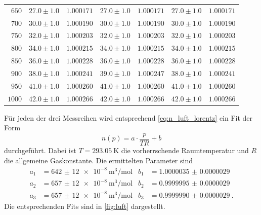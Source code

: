 \begin{table}
\begin{tabular}{r r r r r r r}
    	$650	$ & $ 27.0\pm1.0$ & $	1.000171$ & $ 	27.0\pm1.0$ & $	1.000171$ & $	27.0\pm1.0	$ & $1.000171$ \\
    	$700	$ & $ 30.0\pm1.0$ & $	1.000190$ & $ 	30.0\pm1.0$ & $	1.000190$ & $	30.0\pm1.0	$ & $1.000190$ \\
    	$750	$ & $ 32.0\pm1.0$ & $	1.000203$ & $ 	32.0\pm1.0$ & $	1.000203$ & $	32.0\pm1.0	$ & $1.000203$ \\
    	$800	$ & $ 34.0\pm1.0$ & $	1.000215$ & $ 	34.0\pm1.0$ & $	1.000215$ & $	34.0\pm1.0	$ & $1.000215$ \\
    	$850	$ & $ 36.0\pm1.0$ & $	1.000228$ & $ 	36.0\pm1.0$ & $	1.000228$ & $	36.0\pm1.0	$ & $1.000228$ \\
    	$900	$ & $ 38.0\pm1.0$ & $	1.000241$ & $ 	39.0\pm1.0$ & $	1.000247$ & $	38.0\pm1.0	$ & $1.000241$ \\
    	$950	$ & $ 41.0\pm1.0$ & $	1.000260$ & $ 	41.0\pm1.0$ & $	1.000260$ & $	41.0\pm1.0	$ & $1.000260$ \\
    	$1000	$ & $ 42.0\pm1.0$ & $	1.000266$ & $ 	42.0\pm1.0$ & $	1.000266$ & $	42.0\pm1.0	$ & $1.000266$ \\
        \bottomrule
    \end{tabular}
\end{table}
Für jeden der drei Messreihen wird entsprechend \autoref{eq:n_luft_lorentz} ein Fit der Form
\begin{equation*}
    n(p) = a \cdot \frac{p}{T R} + b 
\end{equation*}
durchgeführt.
Dabei ist $T = \qty{293.05}{\kelvin}$ die vorherrschende Raumtemperatur und $R$ die allgemeine Gaskonstante.
Die ermittelten Parameter sind 
\begin{align*}
    a_1 &= \qty{642(12)e-8}{\cubic\meter\per\mole} & b_1 &= \qty{1.0000035(29)}{} \\
    a_2 &= \qty{657(12)e-8}{\cubic\meter\per\mole} & b_2 &= \qty{0.9999995(29)}{} \\
    a_3 &= \qty{657(12)e-8}{\cubic\meter\per\mole} & b_3 &= \qty{0.9999990(29)}{}.
\end{align*}
Die entsprechenden Fits sind in \autoref{fig:luft} dargestellt.
